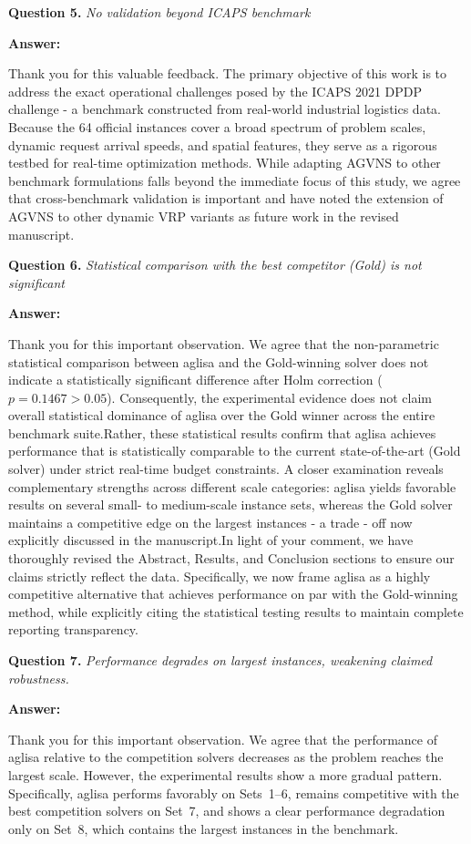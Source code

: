 \documentclass[11pt]{article}
\newcommand{\question}[2]{\vspace{0.5em}\noindent\textbf{Question #1.} \emph{#2}\par}
\newcommand{\answer}{\noindent\textbf{Answer:}\par}
\begin{document}
\question{5}{No validation beyond ICAPS benchmark}
\answer
Thank you for this valuable feedback. The primary objective of this work is to address the exact operational challenges posed by the ICAPS 2021 DPDP challenge - a benchmark constructed from real-world industrial logistics data. Because the 64 official instances cover a broad spectrum of problem scales, dynamic request arrival speeds, and spatial features, they serve as a rigorous testbed for real-time optimization methods. While adapting AGVNS to other benchmark formulations falls beyond the immediate focus of this study, we agree that cross-benchmark validation is important and have noted the extension of AGVNS to other dynamic VRP variants as future work in the revised manuscript.

\question{6}{Statistical comparison with the best competitor (Gold) is not significant}
\answer Thank you for this important observation. We agree that the non-parametric statistical comparison between \gls{aglisa} and the Gold-winning solver does not indicate a statistically significant difference after Holm correction ($p = 0.1467 > 0.05$). Consequently, the experimental evidence does not claim overall statistical dominance of \gls{aglisa} over the Gold winner across the entire benchmark suite.Rather, these statistical results confirm that \gls{aglisa} achieves performance that is statistically comparable to the current state-of-the-art (Gold solver) under strict real-time budget constraints. A closer examination reveals complementary strengths across different scale categories: \gls{aglisa} yields favorable results on several small- to medium-scale instance sets, whereas the Gold solver maintains a competitive edge on the largest instances - a trade - off now explicitly discussed in the manuscript.In light of your comment, we have thoroughly revised the Abstract, Results, and Conclusion sections to ensure our claims strictly reflect the data. Specifically, we now frame \gls{aglisa} as a highly competitive alternative that achieves performance on par with the Gold-winning method, while explicitly citing the statistical testing results to maintain complete reporting transparency.

\question{7}{Performance degrades on largest instances, weakening claimed robustness.}
\answer
Thank you for this important observation. We agree that the performance of \gls{aglisa} relative to the competition solvers decreases as the problem reaches the largest scale. However, the experimental results show a more gradual pattern. Specifically, \gls{aglisa} performs favorably on Sets~1--6, remains competitive with the best competition solvers on Set~7, and shows a clear performance degradation only on Set~8, which contains the largest instances in the benchmark.
\end{document}
